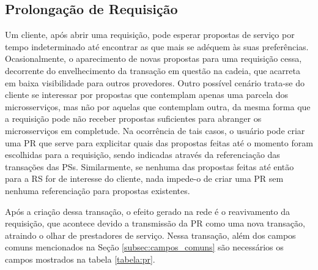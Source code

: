 
\subsection{Prolongação de Requisição}
\label{subsec:proposta:contratual:pr}
%
Um cliente, após abrir uma requisição, pode esperar propostas de serviço por tempo indeterminado até encontrar as que mais se adéquem às suas preferências. Ocasionalmente, o aparecimento de novas propostas para uma requisição cessa, decorrente do envelhecimento da transação em questão na cadeia, que acarreta em baixa visibilidade para outros provedores. Outro possível cenário trata-se do cliente se interessar por propostas que contemplam apenas uma parcela dos microsserviços, mas não por aquelas que contemplam outra, da mesma forma que a requisição pode não receber propostas suficientes para abranger os microsserviços em completude. Na ocorrência de tais casos, o usuário pode criar uma \ac{PR} que serve para explicitar quais das propostas feitas até o momento foram escolhidas para a requisição, sendo indicadas através da referenciação das transações das \acp{PS}. Similarmente, se nenhuma das propostas feitas até então para a \ac{RS} for de interesse do cliente, nada impede-o de criar uma \ac{PR} sem nenhuma referenciação para propostas existentes.

%
Após a criação dessa transação, o efeito gerado na rede é o reavivamento da requisição, que acontece devido a transmissão da \ac{PR} como uma nova transação, atraindo o olhar de prestadores de serviço. Nessa transação, além dos campos comuns mencionados na Seção \ref{subsec:campos_comuns} são necessários os campos mostrados na tabela \ref{tabela:pr}.


